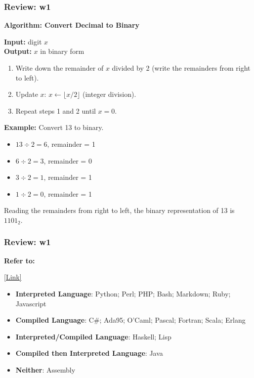 \documentclass[
	11pt, %
]{beamer}
\begin{document}

\begin{frame}
	\frametitle{Review: w1}
\textbf{Algorithm: Convert Decimal to Binary}

\textbf{Input:} digit $x$ \\
\textbf{Output:} $x$ in binary form

\begin{enumerate}
    \item Write down the remainder of $x$ divided by 2 (write the remainders from right to left).
    \item Update $x$: $x \leftarrow \lfloor x / 2 \rfloor$ (integer division).
    \item Repeat steps 1 and 2 until $x = 0$.
\end{enumerate}

\textbf{Example:} Convert 13 to binary.
\begin{itemize}
    \item $13 \div 2 = 6$, remainder = 1
    \item $6 \div 2 = 3$, remainder = 0
    \item $3 \div 2 = 1$, remainder = 1
    \item $1 \div 2 = 0$, remainder = 1
\end{itemize}

Reading the remainders from right to left, the binary representation of 13 is $1101_2$.




\end{frame}


\begin{frame}
	\frametitle{Review: w1}

	\textbf{Refer to:}
 
\hyperlink{slide:q7}{[Link]}

\begin{itemize}
    \item \textbf{Interpreted Language}: Python; Perl; PHP; Bash; Markdown; Ruby; Javascript
    \item \textbf{Compiled Language}: C\#; Ada95; O'Caml; Pascal; Fortran; Scala; Erlang
    \item \textbf{Interpreted/Compiled Language}: Haskell; Lisp
    \item \textbf{Compiled then Interpreted Language}: Java
    \item \textbf{Neither}: Assembly
\end{itemize}

\end{frame}
\end{document}
